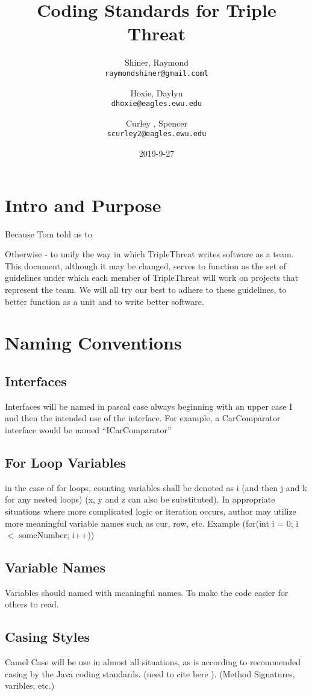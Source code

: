 \documentclass{article}
\title{\huge Coding Standards for Triple Threat}
\date{2019-9-27}
\author{
  Shiner, Raymond\\
  \texttt{raymondshiner@gmail.coml}
  \and
  Hoxie, Daylyn\\
  \texttt{dhoxie@eagles.ewu.edu}
  \and 
  Curley , Spencer\\
   \texttt{scurley2@eagles.ewu.edu}
}
\begin{document}
\maketitle

\newpage
\tableofcontents
\newpage
\section{Intro and Purpose} 
Because Tom told us to

\noindent Otherwise - to unify the way in which TripleThreat writes software as a team. This document, although it may be changed, serves to function as the set of guidelines under which each member of TripleThreat will work on projects that represent the team. We will all try our best to adhere to these guidelines, to better function as a unit and to write better software.

\section{Naming Conventions}
\subsection{Interfaces}
Interfaces will be named in pascal case always beginning with an upper case I and then the intended use of the interface. For example, a CarComparator interface would be named “ICarComparator”
\subsection{For Loop Variables}
in the case of for loops, counting variables shall be denoted as i (and then j and k for any nested loops) (x, y and z can also be substituted). In appropriate situations where more complicated logic or iteration occurs, author may utilize more meaningful variable names such as cur, row, etc.  \newline  Example \newline 
(for(int i = 0; i $<$ someNumber; i++))

\subsection{Variable Names} 
Variables should named with meaningful names. To make the code easier for others to read.
\subsection{Casing Styles}
Camel Case will be use in almost all situations, as is according to recommended casing by the Java coding standards. (need to cite here ). (Method Signatures, varibles, etc.) \newline 
\end{document}
